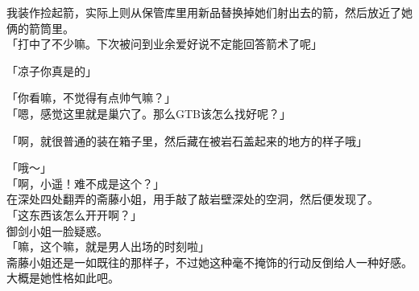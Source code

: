 我装作捡起箭，实际上则从保管库里用新品替换掉她们射出去的箭，然后放近了她俩的箭筒里。\\

「打中了不少嘛。下次被问到业余爱好说不定能回答箭术了呢」

「凉子你真是的」

「你看嘛，不觉得有点帅气嘛？」\\

「嗯，感觉这里就是巢穴了。那么GTB该怎么找好呢？」

「啊，就很普通的装在箱子里，然后藏在被岩石盖起来的地方的样子哦」

「哦～」\\

「啊，小遥！难不成是这个？」\\

在深处四处翻弄的斋藤小姐，用手敲了敲岩壁深处的空洞，然后便发现了。\\

「这东西该怎么开开啊？」\\

御剑小姐一脸疑惑。\\

「嘛，这个嘛，就是男人出场的时刻啦」\\

斋藤小姐还是一如既往的那样子，不过她这种毫不掩饰的行动反倒给人一种好感。大概是她性格如此吧。\\

